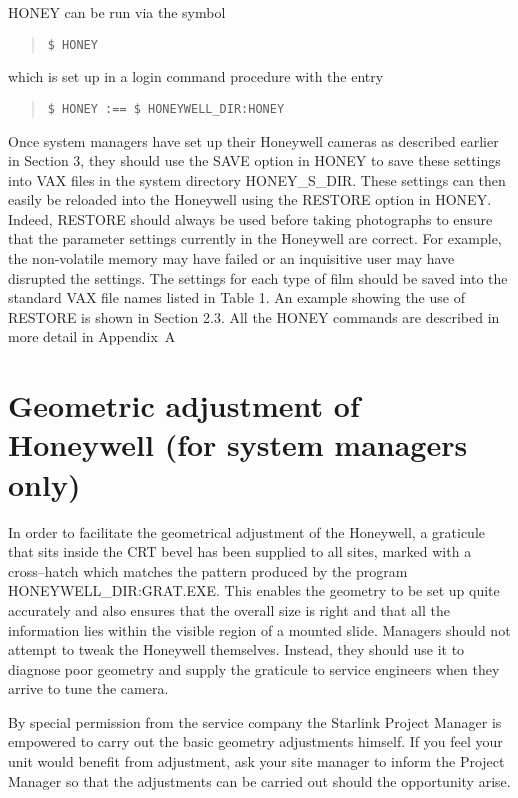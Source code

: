 HONEY can be run via the symbol 

\begin{quote}
\begin{verbatim}
$ HONEY
\end{verbatim}
\end{quote}

which is set up in a login command procedure with the entry

\begin{quote}
\begin{verbatim}
$ HONEY :== $ HONEYWELL_DIR:HONEY
\end{verbatim}
\end{quote}

Once system managers have set up their Honeywell cameras as described earlier in
Section 3, they should use the SAVE option in HONEY to save these settings 
into VAX files in the system directory HONEY\_S\_DIR. These settings can then 
easily be reloaded into the Honeywell using the RESTORE option in HONEY.
Indeed, RESTORE should always be used before taking photographs to ensure that
the parameter settings currently in the Honeywell
are correct. For example, the non-volatile memory
may have failed or an inquisitive user may have disrupted the settings.
The settings for each type of film should be saved into
the standard VAX file names listed in Table 1. An example showing the use
of RESTORE is shown in Section 2.3. All the HONEY commands are described
in more detail in Appendix~A

\section {Geometric adjustment of Honeywell (for system managers only)}

In order to facilitate the geometrical adjustment of the Honeywell, a
graticule that sits inside the CRT bevel has been supplied to all sites, marked
with a cross--hatch which matches the pattern produced by the program
HONEYWELL\_DIR:GRAT.EXE. This enables the geometry to be set up quite accurately and 
also ensures that the overall size is right and that all the information 
lies within the visible region of a mounted slide. Managers should not attempt
to tweak the Honeywell themselves. Instead, they should use it to diagnose 
poor geometry and supply the graticule to service engineers when they arrive to
tune the camera.

By special permission from the service company the Starlink Project Manager
is empowered to carry out the basic geometry adjustments himself. If you feel
your unit would benefit from adjustment, ask your site manager to inform
the Project Manager so that the adjustments can be carried out should the
opportunity arise.

